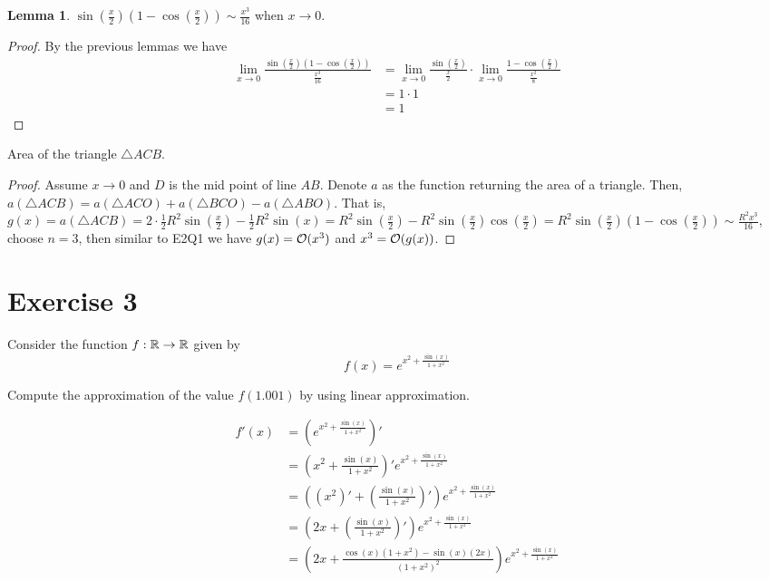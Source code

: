 \documentclass{homework}
\newcommand{\R}{\bb{R}} %
\newcommand{\?}{\stackrel{?}{=}}
\theoremstyle{definition}
\newtheorem*{lemma}{Lemma}
\begin{document}
\begin{lemma}
    $\sin(\frac{x}2)(1-\cos(\frac{x}2))\sim \frac{x^3}{16}$ when $x\to0$.

    \begin{proof}
        By the previous lemmas we have \begin{align*}
            \lim_{x\to0}\frac{\sin(\frac{x}2)(1-\cos(\frac{x}2))}{\frac{x^3}{16}}&=\lim_{x\to0}\frac{\sin(\frac{x}2)}{\frac{x}{2}}\cdot\lim_{x\to0}\frac{1-\cos(\frac{x}2)}{\frac{x^2}{8}}\\
            &=1\cdot1\\
            &=1
        \end{align*}
    \end{proof}
\end{lemma}

\question[4] Area of the triangle $\triangle ACB$.
\begin{proof}
    Assume $x\to0$ and $D$ is the mid point of line $AB$. Denote $a$ as the function returning the area of a triangle. Then, $a(\triangle ACB)=a(\triangle ACO)+a(\triangle BCO)-a(\triangle ABO)$. That is, $g(x)=a(\triangle ACB)=2\cdot\frac12R^2\sin(\frac{x}2)-\frac12R^2\sin(x)=R^2\sin(\frac{x}2)-R^2\sin(\frac{x}2)\cos(\frac{x}{2})=R^2\sin(\frac{x}2)(1-\cos(\frac{x}{2}))\sim \frac{R^2x^3}{16}$, choose $n=3$, then similar to E2Q1 we have $g(x)=\cal{O}(x^3)$ and $x^3=\cal{O}(g(x))$.
\end{proof}


\newpage
\section*{Exercise 3}

Consider the function $f:\R\to\R$ given by \[f(x)=e^{x^2+\frac{\sin(x)}{1+x^2}}\]

\question[1] Compute the approximation of the value $f(1.001)$ by using linear approximation.

\begin{align*}
    f'(x)&=(e^{x^2+\frac{\sin(x)}{1+x^2}})'\\
    &=(x^2+\frac{\sin(x)}{1+x^2})'e^{x^2+\frac{\sin(x)}{1+x^2}}\\
    &=((x^2)'+(\frac{\sin(x)}{1+x^2})')e^{x^2+\frac{\sin(x)}{1+x^2}}\\
    &=(2x+(\frac{\sin(x)}{1+x^2})')e^{x^2+\frac{\sin(x)}{1+x^2}}\\
    &=(2x+\frac{\cos(x)(1+x^2)-\sin(x)(2x)}{(1+x^2)^2})e^{x^2+\frac{\sin(x)}{1+x^2}}\\
\end{align*}
\end{document}
